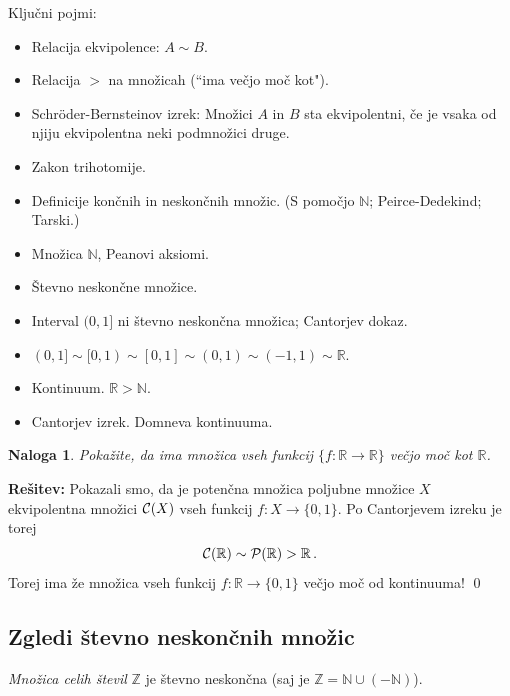 \documentclass[11pt,paper=b5,footinclude,headinclude]{scrbook} %
\newtheorem*{problem}{Naloga}
\begin{document}
Ključni pojmi:
\begin{itemize}
\item Relacija ekvipolence: $A\sim B$.
\item Relacija $>$ na množicah (``ima večjo moč kot").
\item Schröder-Bernsteinov izrek: Množici $A$ in $B$ sta ekvipolentni, če je vsaka od
njiju ekvipolentna neki podmnožici druge.
\item Zakon trihotomije.
\item Definicije končnih in neskončnih množic. (S pomočjo $\mathbb N$; Peirce-Dedekind; Tarski.)
\item Množica $\mathbb N$, Peanovi aksiomi.
\item Števno neskončne množice.
\item Interval $(0,1]$ ni števno neskončna množica; Cantorjev dokaz.
\item $(0,1]\sim [0,1)\sim [0,1]\sim (0,1)\sim (-1,1)\sim \mathbb{R}$.
\item Kontinuum. $\mathbb{R}>\mathbb{N}$.
\item Cantorjev izrek. Domneva kontinuuma.
\end{itemize}

\begin{problem}
Pokažite, da ima množica vseh funkcij
$\{f:\mathbb{R}\to \mathbb{R}\}$ večjo moč kot $\mathbb{R}$.
\end{problem}


\bigskip
\textbf{Rešitev:} Pokazali smo, da je potenčna množica poljubne množice $X$
ekvipolentna množici ${\cal C}(X)$ vseh funkcij $f:X\to \{0,1\}$.
Po Cantorjevem izreku je torej
$${\cal C}(\mathbb{R})\sim {\cal P}(\mathbb{R})>\mathbb{R}\,.$$
Torej ima že množica vseh funkcij $f:\mathbb{R}\to \{0,1\}$ večjo moč od kontinuuma!
\qed


\subsection{Zgledi števno neskončnih množic}

\bigskip
{\em Množica celih števil} $\mathbb{Z}$ je števno neskončna (saj je $\mathbb{Z} = \mathbb{N}\cup (-\mathbb{N})$).
\end{document}
